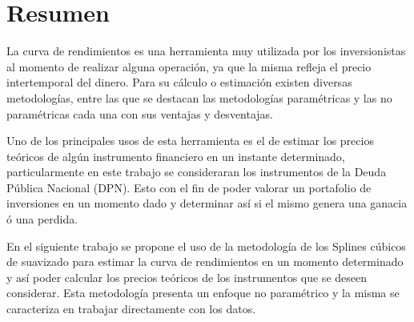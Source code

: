 \chapter*{Resumen}

\hspace{0.4cm} La curva de rendimientos es una herramienta muy utilizada por los inversionistas al momento de realizar alguna operaci\'on, ya que la misma refleja el precio intertemporal del dinero. Para su c\'alculo o estimaci\'on existen diversas metodolog\'ias, entre las que se destacan las metodolog\'ias param\'etricas y las no param\'etricas cada una con sus ventajas y desventajas.

\hspace{0.4cm} Uno de los principales usos de esta herramienta es el de estimar los precios te\'oricos de alg\'un instrumento financiero en un instante determinado, particularmente en este trabajo se consideraran los instrumentos de la Deuda P\'ublica Nacional (DPN). Esto con el fin de poder valorar un portafolio de inversiones en un momento dado y determinar as\'i si el mismo genera una ganacia \'o una perdida.

\hspace{0.4cm} En el siguiente trabajo se propone el uso de la metodolog\'ia de los Splines c\'ubicos de suavizado para estimar la curva de rendimientos en un momento determinado y as\'i poder calcular los precios te\'oricos de los instrumentos que se deseen considerar. Esta metodolog\'ia presenta un enfoque no param\'etrico y la misma se caracteriza en trabajar directamente con los datos. 